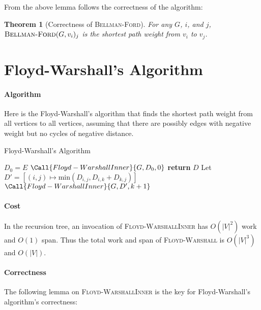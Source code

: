 \documentclass[11pt,a4paper,oneside,microtype,chapter,nokorean]{oblivoir}
\newtheorem{theorem}{Theorem}
\begin{document}
From the above lemma follows the correctness of the algorithm:

\begin{theorem}[Correctness of \textsc{Bellman-Ford}] For any $G$, $i$, and $j$,
  $\textsc{Bellman-Ford}(G,v_i)_{j}$ is the shortest path weight from $v_i$ to $v_j$.
\end{theorem}



\section{Floyd-Warshall's Algorithm}

\paragraph{Algorithm}

Here is the Floyd-Warshall's algorithm that finds the shortest path weight from all vertices to all
vertices, assuming that there are possibly edges with negative weight but no cycles of negative
distance.

\begin{algorithm}
  \caption{Floyd-Warshall's Algorithm}\label{dijkstra}
  \begin{algorithmic}[1]
     
    \State $D_0 = E$ 
    \State $\Call{Floyd-WarshallInner}{G,D_0,0}$
    \EndProcedure
    \Statex
     
    \State \textbf{return} $D$
    \EndIf
    \State Let $D' = [(i,j) \mapsto \textrm{min}(D_{i,j}, D_{i,k} + D_{k,j})]$
    \State $\Call{Floyd-WarshallInner}{G,D',k+1}$
    \EndProcedure
  \end{algorithmic}
\end{algorithm}


\paragraph{Cost}

In the recursion tree, an invocation of \textsc{Floyd-WarshallInner} has $O(|V|^2)$ work and $O(1)$
span.  Thus the total work and span of \textsc{Floyd-Warshall} is $O(|V|^3)$ and $O(|V|)$.


\paragraph{Correctness} The following lemma on \textsc{Floyd-WarshallInner} is the key for
Floyd-Warshall's algorithm's correctness:
\end{document}
